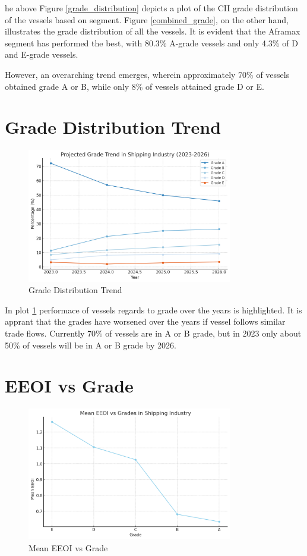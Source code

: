 he above Figure \ref{grade_distribution} depicts a plot of the CII grade distribution of the vessels based on segment. 
Figure \ref{combined_grade}, on the other hand, illustrates the grade distribution of all the vessels. 
It is evident that the Aframax segment has performed the best, with 80.3\% A-grade vessels and only 4.3\% of D and E-grade vessels.

However, an overarching trend emerges, wherein approximately 70\% of vessels obtained grade A or B, while only 8\% of vessels attained grade D or E.

\section{Grade Distribution Trend}

\begin{figure}[h]
    \centering
    \includegraphics[width=0.8\textwidth]{images/grade_trend.png}
    \caption{Grade Distribution Trend}
    \label{grade_trend}
\end{figure}

In plot \ref{grade_trend} performace of vessels regards to grade over the years is highlighted.
It is apprant that the grades have worsened over the years if vessel follows similar trade flows.
Currently 70\% of vessels are in A or B grade, but in 2023 only about 50\% of vessels will be in A or B grade by 2026.

\newpage

\section{EEOI vs Grade}

\begin{figure}[h]
    \centering
    \includegraphics[width=0.8\textwidth]{images/eeoi_grade.png}
    \caption{Mean EEOI vs Grade}
    \label{eeoi_grade}
\end{figure}

